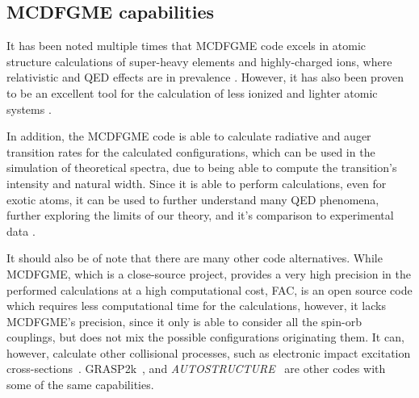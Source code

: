 \subsection{MCDFGME capabilities}

It has been noted multiple times that \gls{MCDFGME} code excels in atomic structure calculations of super-heavy elements and highly-charged ions, where relativistic and QED effects are in prevalence \cite{Indelicato2011,Indelicato1987,Gorceix1987}. However, it has also been proven to be an excellent tool for the calculation of less ionized and lighter atomic systems \cite{Guerra2021}.

In addition, the \gls{MCDFGME} code is able to calculate radiative and auger transition rates for the calculated configurations, which can be used in the simulation of theoretical spectra, due to being able to compute the transition's intensity and natural width.
Since it is able to perform calculations, even for exotic atoms, it can be used to further understand many QED phenomena, further exploring the limits of our theory, and it's comparison to experimental data \cite{Paul2021}.

It should also be of note that there are many other code alternatives. While \gls{MCDFGME}, which is a close-source project, provides a very high precision in the performed calculations at a high computational cost, \gls{FAC}, is an open source code which requires less computational time for the calculations, however, it lacks \gls{MCDFGME}'s precision, since it only is able to consider all the spin-orb couplings, but does not mix the possible configurations originating them. 
It can, however, calculate other collisional processes, such as electronic impact excitation cross-sections~\cite{FAC}. \gls{GRASP2k}~\cite{GRASP2K}, and \textit{AUTOSTRUCTURE}~\cite{AUTOSTRUCTURE} are other codes with some of the same capabilities.


